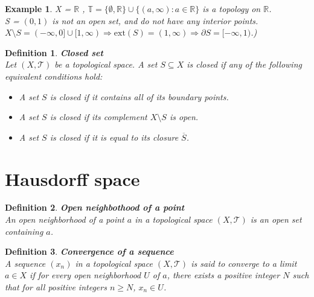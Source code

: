 \documentclass[11pt]{book} %
\newtheorem{definition}{Definition}[section]
\newtheorem*{example*}{Example}
\begin{document}
\begin{example*}
    X = \( \mathbb{R} \) ,  \( \mathbb{T} = \{ \emptyset, \mathbb{R} \} \cup \{ ( a, \infty ) : a \in \mathbb{R} \} \) is a topology on \( \mathbb{R} \). \\
    S = \( (0, 1) \) is not an open set, and do not have any interior points. \\
    $ X \setminus S = (-\infty, 0] \cup [1, \infty) \Rightarrow  \text{ext}(S) = (1, \infty) \Rightarrow \partial S =  [-\infty, 1)  $.)
    
\end{example*}

\begin{definition}{\textbf{Closed set}} \\
    Let \( (X, \mathcal{T}) \) be a topological space. A set \( S \subseteq X \) is closed if any of the following equivalent conditions hold:
    \begin{itemize}
        \item A set \( S \) is closed if it contains all of its boundary points.
        \item A set \( S \) is closed if its complement \( X \setminus S \) is open.
        \item A set \( S \) is closed if it is equal to its closure \( \overline{S} \).
    \end{itemize}
\end{definition}


\section{Hausdorff space}

\begin{definition}{\textbf{Open neighbothood of a point}} \\
    An open neighborhood of a point \( a \) in a topological space \( (X, \mathcal{T}) \) is an open set containing \( a \).
\end{definition}

\begin{definition}{ \textbf{Convergence of a sequence} } \\
    A sequence \( (x_n) \) in a topological space \( (X, \mathcal{T}) \) is said to converge to a limit \( a \in X \) 
    if for every open neighborhood \( U \) of \( a \), there exists a positive integer \( N \) such that for all positive integers \( n \geq N \), \( x_n \in U \).
\end{definition}
\end{document}
